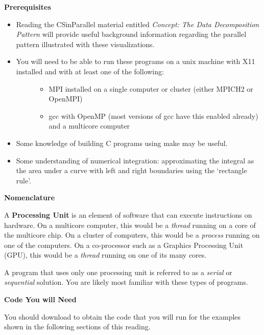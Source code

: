 \documentclass[letterpaper,10pt,openany,oneside]{sphinxmanual}
\begin{document}
\textbf{Prerequisites}
\begin{itemize}
\item {} 
Reading the CSinParallel material entitled \emph{Concept: The Data Decomposition Pattern} will provide useful background information regarding the parallel pattern illustrated with these visualizations.

\item {} \begin{description}
\item[{You will need to be able to run these programs on a unix machine with X11 installed and with at least one of the following:}] \leavevmode\begin{itemize}
\item {} 
MPI installed on a single computer or cluster (either MPICH2 or OpenMPI)

\item {} 
gcc with OpenMP (most versions of gcc have this enabled already) and a multicore computer

\end{itemize}

\end{description}

\item {} 
Some knowledge of building C programs using make may be useful.

\item {} 
Some understanding of numerical integration: approximating the integral as the area under a curve with left and right boundaries using the `rectangle rule'.

\end{itemize}

\textbf{Nomenclature}

A \textbf{Processing Unit} is an element of software that can execute instructions on hardware.  On a multicore computer, this would be a \emph{thread} running on a core of the multicore chip.  On a cluster of computers, this would be a \emph{process} running on one of the computers. On a co-processor such as a Graphics Processing Unit (GPU), this would be a \emph{thread} running on one of its many cores.

A program that uses only one processing unit is referred to as a \emph{serial} or \emph{sequential} solution. You are likely most familiar with these types of programs.

\textbf{Code You will Need}

You should download  to obtain the code that you will run for the examples shown in the following sections of this reading.
\end{document}
